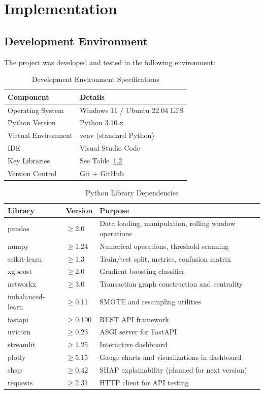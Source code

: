 \chapter{Implementation}

\section{Development Environment}

The project was developed and tested in the following environment:

\begin{table}[H]
\centering
\caption{Development Environment Specifications}
\label{tab:devenv}
\begin{tabular}{|l|l|}
\hline
\textbf{Component} & \textbf{Details}\\
\hline
Operating System & Windows 11 / Ubuntu 22.04 LTS\\
\hline
Python Version & Python 3.10.x\\
\hline
Virtual Environment & venv (standard Python)\\
\hline
IDE & Visual Studio Code\\
\hline
Key Libraries & See Table~\ref{tab:dependencies}\\
\hline
Version Control & Git + GitHub\\
\hline
\end{tabular}
\end{table}

\begin{table}[H]
\centering
\caption{Python Library Dependencies}
\label{tab:dependencies}
\begin{tabular}{|l|l|p{5cm}|}
\hline
\textbf{Library} & \textbf{Version} & \textbf{Purpose}\\
\hline
pandas & $\geq$2.0 & Data loading, manipulation, rolling window operations\\
\hline
numpy & $\geq$1.24 & Numerical operations, threshold scanning\\
\hline
scikit-learn & $\geq$1.3 & Train/test split, metrics, confusion matrix\\
\hline
xgboost & $\geq$2.0 & Gradient boosting classifier\\
\hline
networkx & $\geq$3.0 & Transaction graph construction and centrality\\
\hline
imbalanced-learn & $\geq$0.11 & SMOTE and resampling utilities\\
\hline
fastapi & $\geq$0.100 & REST API framework\\
\hline
uvicorn & $\geq$0.23 & ASGI server for FastAPI\\
\hline
streamlit & $\geq$1.25 & Interactive dashboard\\
\hline
plotly & $\geq$5.15 & Gauge charts and visualizations in dashboard\\
\hline
shap & $\geq$0.42 & SHAP explainability (planned for next version)\\
\hline
requests & $\geq$2.31 & HTTP client for API testing\\
\hline
\end{tabular}
\end{table}

